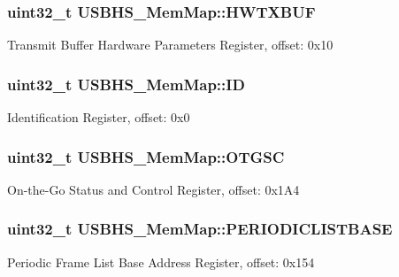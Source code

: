\subsubsection[{H\+W\+T\+X\+B\+U\+F}]{\setlength{\rightskip}{0pt plus 5cm}uint32\+\_\+t U\+S\+B\+H\+S\+\_\+\+Mem\+Map\+::\+H\+W\+T\+X\+B\+U\+F}\label{struct_u_s_b_h_s___mem_map_a2ea6ab8550283d6c27c79416fd767954}
Transmit Buffer Hardware Parameters Register, offset\+: 0x10 \hypertarget{struct_u_s_b_h_s___mem_map_a3358adaf9078bf47a19ac176de27fb3d}{}
\subsubsection[{I\+D}]{\setlength{\rightskip}{0pt plus 5cm}uint32\+\_\+t U\+S\+B\+H\+S\+\_\+\+Mem\+Map\+::\+I\+D}\label{struct_u_s_b_h_s___mem_map_a3358adaf9078bf47a19ac176de27fb3d}
Identification Register, offset\+: 0x0 \hypertarget{struct_u_s_b_h_s___mem_map_ae9adf962bc23fed9d7a56e8c05431560}{}
\subsubsection[{O\+T\+G\+S\+C}]{\setlength{\rightskip}{0pt plus 5cm}uint32\+\_\+t U\+S\+B\+H\+S\+\_\+\+Mem\+Map\+::\+O\+T\+G\+S\+C}\label{struct_u_s_b_h_s___mem_map_ae9adf962bc23fed9d7a56e8c05431560}
On-\/the-\/\+Go Status and Control Register, offset\+: 0x1\+A4 \hypertarget{struct_u_s_b_h_s___mem_map_a17104676a5c5f73116d9d0df087f06e4}{}
\subsubsection[{P\+E\+R\+I\+O\+D\+I\+C\+L\+I\+S\+T\+B\+A\+S\+E}]{\setlength{\rightskip}{0pt plus 5cm}uint32\+\_\+t U\+S\+B\+H\+S\+\_\+\+Mem\+Map\+::\+P\+E\+R\+I\+O\+D\+I\+C\+L\+I\+S\+T\+B\+A\+S\+E}\label{struct_u_s_b_h_s___mem_map_a17104676a5c5f73116d9d0df087f06e4}
Periodic Frame List Base Address Register, offset\+: 0x154 \hypertarget{struct_u_s_b_h_s___mem_map_ab9d19f0a7d75a0719e21dec6c883577e}{}
